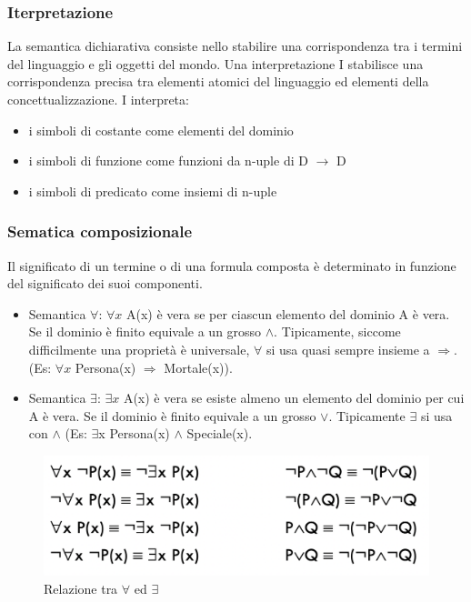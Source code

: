 \documentclass{article}
\begin{document}
\subsubsection{Iterpretazione}
La semantica dichiarativa consiste nello stabilire una corrispondenza tra i termini del linguaggio e gli oggetti del mondo. \newline
Una interpretazione I stabilisce una corrispondenza precisa tra elementi atomici del linguaggio ed elementi della concettualizzazione. I interpreta:
\begin{itemize}
    \item i simboli di costante come elementi del dominio
    \item i simboli di funzione come funzioni da n-uple di D $\rightarrow$ D
    \item i simboli di predicato come insiemi di n-uple
\end{itemize}

\subsubsection{Sematica composizionale}
Il significato di un termine o di una formula composta è determinato in funzione del significato dei suoi componenti.
\begin{itemize}
    \item Semantica $\forall$:  $\forall x$ A(x) è vera se per ciascun elemento del dominio A è vera. Se il dominio è finito equivale a un grosso $\land$. Tipicamente, siccome difficilmente una proprietà è universale, $\forall$ si usa quasi sempre insieme a $\Rightarrow$. (Es: $\forall x$ Persona(x) $\Rightarrow$ Mortale(x)).
    \item Semantica $\exists$: $\exists x$ A(x) è vera se esiste almeno un elemento del dominio per cui A è vera. Se il dominio è finito equivale a un grosso $\lor$. Tipicamente $\exists$ si usa con $\land$ (Es: $\exists$x Persona(x) $\land$ Speciale(x).
\end{itemize}
\begin{figure}[h!]
\centering
\includegraphics[scale=0.3]{Images/foarallexistsrelation.png}
\caption{Relazione tra $\forall$ ed $\exists$}
\end{figure}
\end{document}

